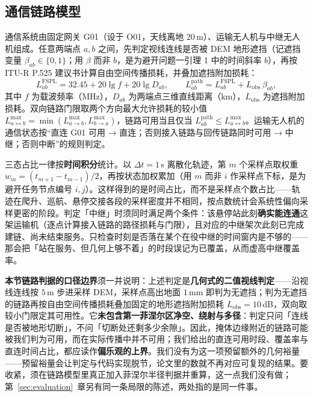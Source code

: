 \subsection{通信链路模型}
\label{sec:link-model}

通信系统由固定网关 G01（设于 O01，天线离地 20\,m）、运输无人机与中继无人机组成。任意两端点 $a,b$ 之间，先判定视线连线是否被 DEM 地形遮挡（记遮挡变量 $\beta_{ab}\in\{0,1\}$；用 $\beta$ 而非 $b$，是为避开问题一引理 1 中的时间斜率 $b$），再按 ITU-R P.525 建议书计算自由空间传播损耗\cite{itu2024p525}，并叠加遮挡附加损耗：
\begin{equation}
	L^{\mathrm{FSPL}}_{ab}=32.45+20\lg f + 20\lg D_{ab},\qquad
	L^{\mathrm{path}}_{ab}=L^{\mathrm{FSPL}}_{ab}+L_{\mathrm{obs}}\,\beta_{ab},
	\label{eq:pathloss}
\end{equation}
其中 $f$ 为载波频率（MHz），$D_{ab}$ 为两端点三维直线距离（km），$L_{\mathrm{obs}}$ 为遮挡附加损耗。双向链路门限取两个方向最大允许损耗的较小值 $L^{\max}_{a\leftrightarrow b}=\min(L^{\max}_{a\to b},L^{\max}_{b\to a})$，链路可用当且仅当 $L^{\mathrm{path}}_{ab}\le L^{\max}_{a\leftrightarrow b}$。运输无人机的通信状态按“直连 G01 可用 → 直连；否则接入链路与回传链路同时可用 → 中继；否则中断”的规则判定。

三态占比一律按\textbf{时间积分}统计。以 $\Delta t=1$\,s 离散化轨迹，第 $m$ 个采样点取权重 $w_m=(t_{m+1}-t_{m-1})/2$，再按状态加权累加（用 $m$ 而非 $i$ 作采样点下标，是为避开任务节点编号 $i,j$）。这样得到的是时间占比，而不是采样点个数占比——轨迹在爬升、巡航、悬停交接各段的采样密度并不相同，按点数统计会系统性偏向采样更密的阶段。判定「中继」时须同时满足两个条件：该悬停站此刻\textbf{确实能连通}这架运输机（逐点计算接入链路的路径损耗与门限），且对应的中继架次此刻已完成建链、尚未结束服务。只检查时刻是否落在某个在役中继的时间窗内是不够的——那会把「站在服务、但几何上够不着」的时段误记为已覆盖，从而虚高中继覆盖率。\label{sec:comm-caliber}

\noindent\textbf{本节链路判据的口径边界}须一并说明：上述判定是\textbf{几何式的二值视线判定}——沿视线连线按 $5$\,m 步进采样 DEM，采样点高出地面 $1$\,mm 即判为无遮挡；判为无遮挡的链路再按自由空间传播损耗叠加固定的地形遮挡附加损耗 $L_{\mathrm{obs}}=10$\,dB，双向取较小门限定其可用性。它\textbf{未包含第一菲涅尔区净空、绕射与多径}：判定只问「连线是否被地形切断」，不问「切断处还剩多少余隙」。因此，掩体边缘附近的链路可能被我们判为可用，而在实际传播中并不可用；我们给出的直连可用时段、覆盖率与直连时间占比，都应读作\textbf{偏乐观的上界}。我们没有为这一项预留额外的几何裕量——预留裕量会让判定与代码实现脱节，论文里的数就不再对应可复现的结果。要收紧，须在链路模型里真正加入菲涅尔半径判据并重算，这一点我们没有做；第~\ref{sec:evaluation}~章另有同一条局限的陈述，两处指的是同一件事。
